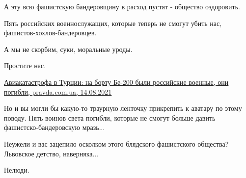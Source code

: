 \begin{itemize}
А эту всю фашистскую бандеровщину в расход пустят - общество оздоровить.

Пять российских военнослужащих, которые теперь не смогут убить нас,
фашистов-хохлов-бандеровцев.

А мы не скорбим, суки, моральные уроды.

Простите нас.

\href{https://www.pravda.com.ua/rus/news/2021/08/14/7303859/}{%
Авиакатастрофа в Турции: на борту Бе-200 были российские военные, они погибли, pravda.com.ua, 14.08.2021%
}

Но и вы могли бы какую-то траурную ленточку прикрепить к аватару по этому
поводу. Пять воинов света погибли, которые не смогут больше давить
фашистско-бандеровскую мразь...

Неужели и вас зацепило осколком этого блядского фашистского общества? Львовское
детство, наверняка...

 
Нелюди.

\end{itemize}

